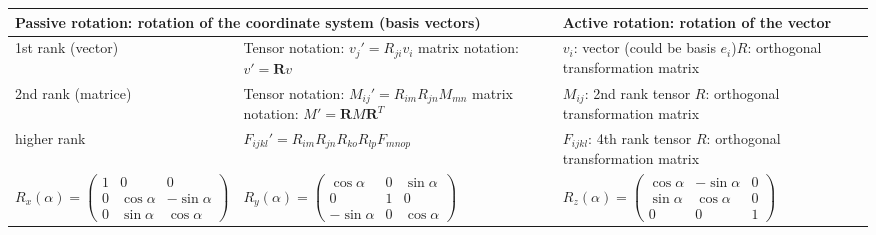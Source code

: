 	\begin{tabularx}{\columnwidth}{p{4.8cm}Xp{4.8cm}}	
		\hline 
		\multicolumn{2}{p{8cm}}{\textbf{Passive rotation}: rotation of the coordinate system (basis vectors)} & \textbf{Active rotation}: rotation of the vector  \\
		\hline
		1st rank (vector) & Tensor notation: $v_j' = R_{ji}v_i$  \newline matrix notation: $v' =  \textbf{R}v$ & $v_i$: vector (could be basis $e_i$)\newline $R$: orthogonal transformation matrix\\
		\hline 
		2nd rank (matrice) & Tensor notation: $M_{ij}' = R_{im}R_{jn}M_{mn}$  \newline matrix notation: $M' =  \textbf{R}M\textbf{R}^T$ & $M_{ij}$: 2nd rank tensor \newline $R$: orthogonal transformation matrix\\
		\hline 
		higher rank & $F_{ijkl}' = R_{im}R_{jn}R_{ko}R_{lp}F_{mnop}$  \newline & $F_{ijkl}$: 4th rank tensor \newline $R$: orthogonal transformation matrix\\					
		\hline
					
		$R_x(\alpha) = \begin{pmatrix} 
		1 &   0         & 0           \\
		0 & \cos \alpha & -\sin \alpha \\
		0 & \sin \alpha &  \cos \alpha
		\end{pmatrix} $ &
		$R_y(\alpha) = \begin{pmatrix} 
		\cos \alpha  & 0 & \sin \alpha \\
		0         & 1 &  0          \\
		-\sin \alpha & 0 & \cos \alpha
		\end{pmatrix} $ &
		$R_z(\alpha) = \begin{pmatrix} 
		\cos \alpha & -\sin \alpha & 0 \\
		\sin \alpha &  \cos \alpha & 0 \\            
		0        &  0           & 1
		\end{pmatrix}$\\
					
	\hline 
	\end{tabularx}
	

